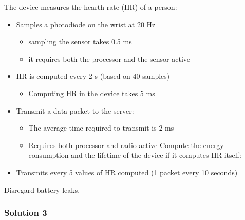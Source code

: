 The device measures the hearth-rate (HR) of a person:
\begin{itemize}
	\item 
	Samples a photodiode on the wrist at 20 Hz
	\begin{itemize}
		\item 
		sampling the sensor takes 0.5 ms
		\item 
		it requires both the processor and the sensor active
	\end{itemize}
	\item 
	HR is computed every 2 s (based on 40 samples)
	\begin{itemize}
		\item 
		Computing HR in the device takes 5 ms
	\end{itemize}
	\item 
	Transmit a data packet to the server:
	\begin{itemize}
		\item 
		The average time required to transmit is 2 ms
		\item 
		Requires both processor and radio active
		Compute the energy consumption and the lifetime of the device if it computes HR itself:
	\end{itemize}
	\item 
	Transmits every 5 values of HR computed (1 packet every 10 seconds)
	
\end{itemize}
Disregard battery leaks.
\subsubsection{Solution 3}

